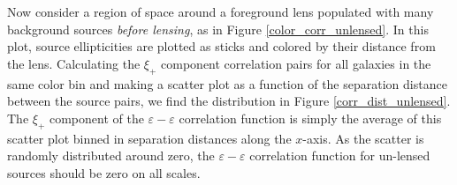 \documentclass[%
 reprint,
 amsmath,amssymb,
 aps,nofootinbib
]{revtex4-1}
\begin{document}
Now consider a region of space around a foreground lens populated with many background sources \textit{before lensing}, as in Figure \ref{color_corr_unlensed}. In this plot, source ellipticities are plotted as sticks and colored by their distance from the lens. Calculating the $\xi_+$ component correlation pairs for all galaxies in the same color bin and making a scatter plot as a function of the separation distance between the source pairs, we find the distribution in Figure \ref{corr_dist_unlensed}. The $\xi_+$ component of the $\varepsilon-\varepsilon$ correlation function is simply the average of this scatter plot binned in separation distances along the $x$-axis. As the scatter is randomly distributed around zero, the $\varepsilon-\varepsilon$ correlation function for un-lensed sources should be zero on all scales.
\end{document}
